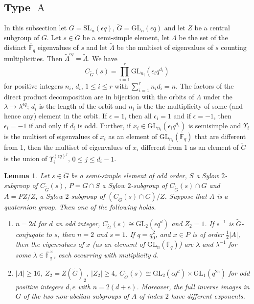 \documentclass{amsart}
\theoremstyle{plain}\newtheorem{Theorem}{Theorem}[section]
\theoremstyle{plain}\newtheorem{Conjecture}[Theorem]{Conjecture}
\theoremstyle{plain}\newtheorem{Corollary}[Theorem]{Corollary}
\theoremstyle{plain}\newtheorem{Lemma}[Theorem]{Lemma}
\theoremstyle{plain}\newtheorem{Proposition}[Theorem]{Proposition}
\theoremstyle{definition}\newtheorem{Definition}[Theorem]{Definition}
\theoremstyle{definition}\newtheorem{Example}[Theorem]{Example}
\theoremstyle{definition}\newtheorem{Examples}[Theorem]{Examples}
\theoremstyle{definition}\newtheorem{Exercise}[Theorem]{Exercise}
\theoremstyle{definition}\newtheorem{Notation}[Theorem]{Notation}
\theoremstyle{definition}\newtheorem{Remark}[Theorem]{Remark}
\theoremstyle{definition}\newtheorem{Remarks}[Theorem]{Remarks}
\def\GL{\mathrm{GL}}
\def\SL{\mathrm{SL}}
\newcommand{\type}{\operatorname}
\newcommand{\wt}{\widetilde}
\numberwithin{equation}{section}
\begin{document}
\subsection{Type $\type{A}$} In this subsection let $G= \SL_n(\epsilon q)$,   $\wt{G}= \GL_n (\epsilon q) $ and let $Z$ be a central subgroup of  $G$.  Let  $s \in \wt{G}$ be a semi-simple element,  let $\Lambda $  be  the  set of the distinct  $\bar{\mathbb F}_q $ eigenvalues of $s$  and let
$\tilde \Lambda $  be the  multiset of eigenvalues  of $s$ counting multiplicities.  Then  $\tilde \Lambda ^{\epsilon q} = \tilde \Lambda $.
 We have \begin{equation}\label{eq:centdecomp} C_{\wt{G}}(s) =  \prod_{i=1}^r  \GL_{n_i}(\epsilon_i q^{d_i}) \end{equation} for  positive  integers   $ n_i $, $ d_i $, $ 1\leq i \leq  r $ with $\sum_{i=1}^r n_id_i = n $.  The factors of  the  direct product decomposition are in bijection with   the orbits  of  $\Lambda $ under the  $\lambda \to \lambda^{\epsilon q} $;
  $d_i$ is the length of the orbit and $n_i$  is the   the multiplicity of  some (and hence any)  element in the orbit. If $\epsilon=1 $, then all $\epsilon_i=1 $ and if $\epsilon=-1 $, then $\epsilon_i=-1 $ if and only if $d_i$ is odd. Further, if $x_i \in  \GL_{n_i}(\epsilon_i q^{d_i})  $ is  semisimple  and $ \Upsilon_i $ is the multiset  of eigenvalues of  $x_i$ as an element of   $\GL_{n_i}( \bar {\mathbb F}_q) $  that are different from $1$, then the  multiset of  eigenvalues of  $x_i$ different from $1$  as an element of $\wt{G}$ is the  union  of   $\Upsilon_i ^{ (\epsilon q)^j } $, $ 0\leq  j \leq d_i -1 $.


\begin{Lemma}  \label{lem-centralSylow2}  Let $s \in \wt{G}$ be  a semi-simple element of odd order,  $S$   a  Sylow  $2$-subgroup  of $C_{\wt{G}}(s)$, $P = G\cap  S$  a  Sylow $2$-subgroup of   $C_{\wt{G}}(s) \cap  G $   and $ A =  PZ/Z$,  a Sylow  $2$-subgroup  of $ (C_{\wt{G}}(s) \cap G )/Z$. Suppose that  $A$  is  a quaternion group.  
  Then  one of the following holds.
\begin{enumerate} \item  [(i)]
$n=2d $  for  $d$ an odd   integer, $ C_{\wt{G}}(s) \cong \GL_2 (\epsilon q^d) $ and $Z_2=1 $.  If  $s^{-1}$ is   $\wt{G}$-conjugate to $s$, then  $n=2$ and $s=1 $. If   $q =q_0^2$, and  $ x \in P $  is  of order $\frac{1}{2}|A|$, then the eigenvalues of  $x$     (as an element of 
$\GL_n(\bar {\mathbb {F}}_q) $) are  $\lambda $ and $\lambda^{-1}$   for some   $\lambda \in \bar {\mathbb {F}}_q^{\times} $,  each occurring with  mutiplicity  $d$.
\item [(ii)]  $|A|\geq 16$,   $ Z_2 =Z(\wt{G})_2 $,  $ |Z_2| \geq 4$,  $C_{\wt{G}}(s)  \cong  \GL_{2}(\epsilon q^{d}) \times \GL_1(q^{2e}) $ 
 for odd  positive integers $d, e $ with  $ n = 2(d + e)$. Moreover,   the full inverse images  in $G$ of the two non-abelian   subgroups of $A$ of  index $2$  have different exponents.  
\end{enumerate}
\end{Lemma}
\end{document}

